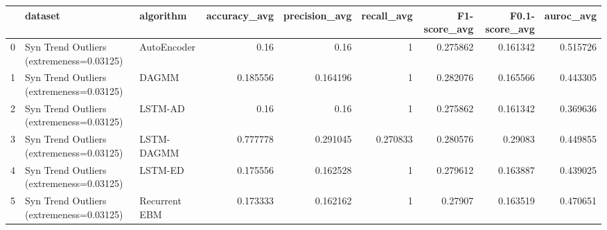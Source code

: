 \begin{tabular}{rllrrrrrr}
\hline
    & dataset                                  & algorithm     &   accuracy\_avg &   precision\_avg &   recall\_avg &   F1-score\_avg &   F0.1-score\_avg &   auroc\_avg \\
\hline
  0 & Syn Trend Outliers (extremeness=0.03125) & AutoEncoder   &       0.16     &        0.16     &     1        &       0.275862 &         0.161342 &    0.515726 \\
  1 & Syn Trend Outliers (extremeness=0.03125) & DAGMM         &       0.185556 &        0.164196 &     1        &       0.282076 &         0.165566 &    0.443305 \\
  2 & Syn Trend Outliers (extremeness=0.03125) & LSTM-AD       &       0.16     &        0.16     &     1        &       0.275862 &         0.161342 &    0.369636 \\
  3 & Syn Trend Outliers (extremeness=0.03125) & LSTM-DAGMM    &       0.777778 &        0.291045 &     0.270833 &       0.280576 &         0.29083  &    0.449855 \\
  4 & Syn Trend Outliers (extremeness=0.03125) & LSTM-ED       &       0.175556 &        0.162528 &     1        &       0.279612 &         0.163887 &    0.439025 \\
  5 & Syn Trend Outliers (extremeness=0.03125) & Recurrent EBM &       0.173333 &        0.162162 &     1        &       0.27907  &         0.163519 &    0.470651 \\
\hline
\end{tabular}

